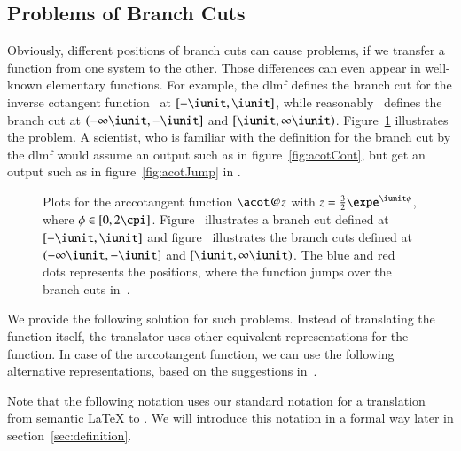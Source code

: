 \subsection{Problems of Branch Cuts}\label{subsec:branch-cut-issues}
Obviously, different positions of branch cuts can cause problems, if we transfer a function from one system to the other. Those differences can even appear in well-known elementary functions. For example, the \gls{dlmf} defines the branch cut for the inverse cotangent function~\cite[(4.23.9)]{NIST:DLMF} at $[-\iunit, \iunit]$, while \Maple{} reasonably~\cite{Branches:acot} defines the branch cut at $(-\infty\iunit, -\iunit]$ and $[\iunit, \infty\iunit)$. Figure~\ref{fig:acot} illustrates the problem. A scientist, who is familiar with the definition for the branch cut by the \gls{dlmf} would assume an output such as in figure~\ref{fig:acotCont}, but get an output such as in figure~\ref{fig:acotJump} in \Maple.

\begin{figure}[!ht]
    \centering
    \hspace{0.2cm}
    \caption{Plots for the arccotangent function $\acot@{z}$ with $z = \frac{3}{2}\expe^{\iunit\phi}$, where $\phi \in [0,2\cpi]$. Figure~\protect{} illustrates a branch cut defined at $[-\iunit, \iunit]$ and figure~\protect{} illustrates the branch cuts defined at $(-\infty\iunit, -\iunit]$ and $[\iunit, \infty\iunit)$. The blue and red dots represents the positions, where the function jumps over the branch cuts in~\protect{}.}
    \label{fig:acot}
\end{figure}

We provide the following solution for such problems. Instead of translating the function itself, the translator uses other equivalent representations for the function. In case of the arccotangent function, we can use the following alternative representations, based on the suggestions in~\cite{Branches:acot}.

Note that the following notation uses our standard notation for a translation from semantic \LaTeX{} to \Maple. We will introduce this notation in a formal way later in section~\ref{sec:definition}.

